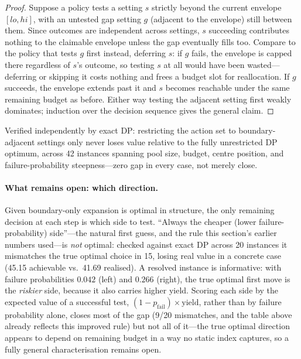 \begin{proof}
Suppose a policy tests a setting $s$ strictly beyond the current envelope
$[lo,hi]$, with an untested gap setting $g$ (adjacent to the envelope) still
between them. Since outcomes are independent across settings, $s$ succeeding
contributes nothing to the claimable envelope unless the gap eventually fills
too. Compare to the policy that tests $g$ first instead, deferring $s$: if
$g$ fails, the envelope is capped there regardless of $s$'s outcome, so
testing $s$ at all would have been wasted---deferring or skipping it costs
nothing and frees a budget slot for reallocation. If $g$ succeeds, the
envelope extends past it and $s$ becomes reachable under the same remaining
budget as before. Either way testing the adjacent setting first weakly
dominates; induction over the decision sequence gives the general claim.
\end{proof}

Verified independently by exact DP: restricting the action set to
boundary-adjacent settings only never loses value relative to the fully
unrestricted DP optimum, across 42 instances spanning pool size, budget,
centre position, and failure-probability steepness---zero gap in every case,
not merely close.

\paragraph{What remains open: which direction.} Given boundary-only expansion
is optimal in structure, the only remaining decision at each step is which
side to test. ``Always the cheaper (lower failure-probability) side''---the
natural first guess, and the rule this section's earlier numbers used---is
\emph{not} optimal: checked against exact DP across 20 instances it
mismatches the true optimal choice in 15, losing real value in a concrete
case (45.15 achievable vs.\ 41.69 realised). A resolved instance is
informative: with failure probabilities $0.042$ (left) and $0.266$ (right),
the true optimal first move is the \emph{riskier} side, because it also
carries higher yield. Scoring each side by the expected value of a
successful test, $(1{-}p_{\mathrm{fail}})\times\mathrm{yield}$, rather than
by failure probability alone, closes most of the gap (9/20 mismatches, and
the table above already reflects this improved rule) but not all of it---the
true optimal direction appears to depend on remaining budget in a way no
static index captures, so a fully general characterisation remains open.

